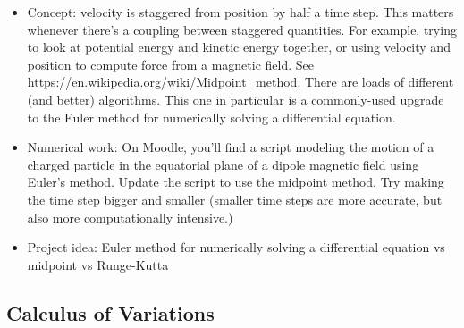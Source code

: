 \documentclass[10pt]{article}
\begin{document}
\begin{itemize}

    \item Concept: velocity is staggered from position by half a time step. This matters whenever there's a coupling between staggered quantities. For example, trying to look at potential energy and kinetic energy together, or using velocity and position to compute force from a magnetic field. See \url{https://en.wikipedia.org/wiki/Midpoint_method}. There are loads of different (and better) algorithms. This one in particular is a commonly-used upgrade to the Euler method for numerically solving a differential equation. 

    \item Numerical work: On Moodle, you'll find a script modeling the motion of a charged particle in the equatorial plane of a dipole magnetic field using Euler's method. Update the script to use the midpoint method. Try making the time step bigger and smaller (smaller time steps are more accurate, but also more computationally intensive.)

    \item Project idea: Euler method for numerically solving a differential equation vs midpoint vs Runge-Kutta

\end{itemize}

\subsection*{Calculus of Variations}
\end{document}
